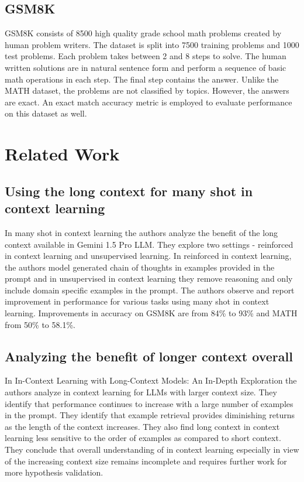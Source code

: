 \documentclass{article}
\begin{document}
\subsection{GSM8K}
GSM8K \cite{cobbe2021gsm8k} consists of 8500 high quality grade school math problems created by human problem writers. The dataset is split into 7500 training problems and 1000 test problems. Each problem takes between 2 and 8 steps to solve. The human written solutions are in natural sentence form and perform a sequence of basic math operations in each step. The final step contains the answer. Unlike the MATH dataset, the problems are not classified by topics. However, the answers are exact. An exact match accuracy metric is employed to evaluate performance on this dataset as well.
\section{Related Work}
\subsection{Using the long context for many shot in context learning}
In many shot in context learning \cite{agarwal2024manyshotincontextlearning} the authors analyze the benefit of the long context available in Gemini 1.5 Pro LLM. They explore two settings - reinforced in context learning and unsupervised learning. In reinforced in context learning, the authors model generated chain of thoughts in examples provided in the prompt and in unsupervised in context learning they remove reasoning and only include domain specific examples in the prompt. The authors observe and report improvement in performance for various tasks using many shot in context learning. Improvements in accuracy on GSM8K \cite{cobbe2021gsm8k} are from 84\% to 93\% and MATH \cite{hendrycksmath2021} from 50\% to 58.1\%.

\subsection{Analyzing the benefit of longer context overall}
In In-Context Learning with Long-Context Models: An In-Depth
Exploration \cite{bertsch2024incontextlearninglongcontextmodels} the authors analyze in context learning for LLMs with larger context size. They identify that performance continues to increase with a large number of examples in the prompt. They identify that example retrieval provides diminishing returns as the length of the context increases. They also find long context in context learning less sensitive to the order of examples as compared to short context. They conclude that overall understanding of in context learning especially in view of the increasing context size remains incomplete and requires further work for more hypothesis validation.
\end{document}
